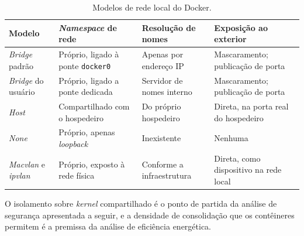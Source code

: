 \begin{table}[h!]
	\centering
	\caption{Modelos de rede local do Docker.}
	\label{tab:redes-docker}
	\footnotesize
	\renewcommand{\arraystretch}{1.1}
	\begin{tabularx}{\textwidth}{@{} l X X X @{}}
		\toprule
		\textbf{Modelo} & \textbf{\emph{Namespace} de rede} & \textbf{Resolução de nomes} & \textbf{Exposição ao exterior} \\
		\midrule
		\emph{Bridge} padrão & Próprio, ligado à ponte \texttt{docker0} & Apenas por endereço IP & Mascaramento; publicação de porta \\
		\emph{Bridge} do usuário & Próprio, ligado a ponte dedicada & Servidor de nomes interno & Mascaramento; publicação de porta \\
		\emph{Host} & Compartilhado com o hospedeiro & Do próprio hospedeiro & Direta, na porta real do hospedeiro \\
		\emph{None} & Próprio, apenas \emph{loopback} & Inexistente & Nenhuma \\
		\emph{Macvlan} e \emph{ipvlan} & Próprio, exposto à rede física & Conforme a infraestrutura & Direta, como dispositivo na rede local \\
		\bottomrule
	\end{tabularx}
\end{table}

O isolamento sobre \emph{kernel} compartilhado é o ponto de partida da análise de segurança apresentada a seguir, e a densidade de consolidação que os contêineres permitem é a premissa da análise de eficiência energética.
